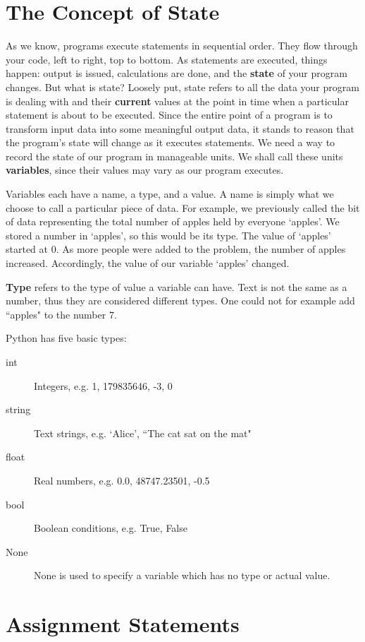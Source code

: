 \section{The Concept of State}

As we know, programs execute statements in sequential order. They flow through your code, left to right, top to bottom. As statements are executed, things happen: output is issued, calculations are done, and the \textbf{state} of your program changes. But what is state?   Loosely put, state refers to all the data your program is dealing with   and their \textbf{current} values at the point in time when a   particular statement is about to be executed. Since the entire point of a program is to transform input data into some meaningful output data, it stands to reason that the program's state will change as it executes statements. We need a way to record the state of our program in manageable units. We shall call these units   \textbf{variables}, since their values may vary as our program executes.

Variables each have a name, a type, and a value. A name is simply   what we choose to call a particular piece of data. For example, we   previously called the bit of data representing the total number of   apples held by everyone `apples'. We stored a number in `apples', so this would be its type. The value of `apples' started at 0. As more people were added to the problem, the number of apples   increased. Accordingly, the value of our variable   `apples' changed.

\textbf{Type} refers to the type of value a variable can   have. Text is not the same as a number, thus they are considered   different types. One could not for example add ``apples" to the number   7. 

Python has five basic types:
\begin{description}
	\item[int] Integers, e.g. 1, 179835646, -3, 0
	\item[string] Text strings, e.g. `Alice', ``The cat sat on the mat"
	\item[float] Real numbers, e.g. 0.0, 48747.23501, -0.5
	\item[bool] Boolean conditions, e.g. True, False
	\item[None] None is used to specify a variable which has no type or actual value.
\end{description}

\section{Assignment Statements}

